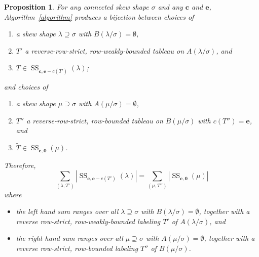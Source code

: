 \documentclass[11pt]{article}
\newtheorem{prop}[theorem]{Proposition}
\theoremstyle{definition}
\DeclareMathOperator{\Semi}{SS}
\newcommand{\bfc}{\mathbf{c}}
\newcommand{\bfe}{\mathbf{e}}
\newcommand{\bfzr}{\mathbf{0}}
\newcommand{\wt}{\widetilde}
\begin{document}
\begin{prop} \label{p:main}
For any connected skew shape $\sigma$ and any $\bfc$ and $\bfe$, Algorithm~\ref{algorithm} produces a bijection between choices of 
\begin{enumerate}
\item a skew shape $\lambda \supseteq \sigma$ with $B(\lambda/\sigma)=\emptyset$,
\item $T'$ a reverse-row-strict, row-weakly-bounded tableau on $A(\lambda/\sigma)$, and
\item $T\in \Semi_{\bfc,\bfe-c(T')}(\lambda)$;
\end{enumerate}

\noindent
and choices of
\begin{enumerate}
\item a skew shape $\mu\supseteq \sigma$ with $A(\mu/\sigma)=\emptyset$,
\item $T''$ a reverse-row-strict, row-bounded tableau on $B(\mu/\sigma)$ with $c(T'')=\bfe$, and
\item $\wt{T} \in \Semi_{\bfc,\bfzr}(\mu)$.
\end{enumerate}
Therefore, 
\begin{equation}\label{eq:ss}
\sum_{(\lambda, T')} |\Semi_{\bfc, \bfe-c(T')}(\lambda)| = \sum_{(\mu,T'')} |\Semi_{\bfc, \mathbf{0}}(\mu)|
\end{equation}
where
\begin{itemize}
\item the left hand sum ranges over all $\lambda\supseteq \sigma$ with $B(\lambda/\sigma)=\emptyset$, together with a reverse row-strict, row-weakly-bounded labeling $T'$ of $A(\lambda/\sigma)$, and
\item the right hand sum ranges over all $\mu\supseteq \sigma$ with $A(\mu/\sigma) = \emptyset$, together with a reverse row-strict, row-bounded labeling $T''$ of $B(\mu/\sigma)$.
\end{itemize}
\end{prop}
\end{document}
